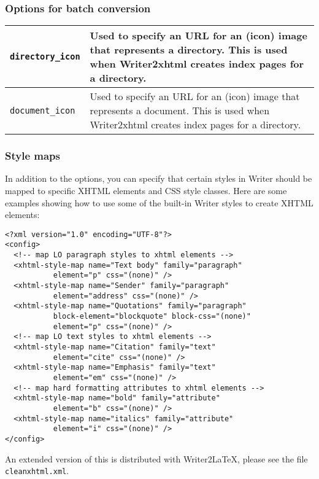 \documentclass{article}
\newcommand\textstyleSourceText[1]{\texttt{\textmd{#1}}}
\begin{document}
\subsubsection{Options for batch conversion}
\begin{center}
\begin{tabular}{|l|l|}

\hline
\mdseries \textstyleSourceText{directory\_icon} & \mdseries Used to specify an URL for an (icon) image that represents a directory. This is used when Writer2xhtml creates index pages for a directory.\\\hline
\mdseries \textstyleSourceText{document\_icon} & \mdseries Used to specify an URL for an (icon) image that represents a document. This is used when Writer2xhtml creates index pages for a directory.\\\hline
\end{tabular}
\end{center}
\subsubsection{Style maps}
{\mdseries
In addition to the options, you can specify that certain styles in Writer should be mapped to specific XHTML elements and CSS style classes. Here are some examples showing how to use some of the built-in Writer styles to create XHTML elements:}

\begin{verbatim}
<?xml version="1.0" encoding="UTF-8"?>
<config>
  <!-- map LO paragraph styles to xhtml elements -->
  <xhtml-style-map name="Text body" family="paragraph"   
           element="p" css="(none)" />  
  <xhtml-style-map name="Sender" family="paragraph"
           element="address" css="(none)" />
  <xhtml-style-map name="Quotations" family="paragraph"
           block-element="blockquote" block-css="(none)"
           element="p" css="(none)" />
  <!-- map LO text styles to xhtml elements -->
  <xhtml-style-map name="Citation" family="text"
           element="cite" css="(none)" />
  <xhtml-style-map name="Emphasis" family="text"
           element="em" css="(none)" />
  <!-- map hard formatting attributes to xhtml elements -->
  <xhtml-style-map name="bold" family="attribute"
           element="b" css="(none)" />
  <xhtml-style-map name="italics" family="attribute"
           element="i" css="(none)" />
</config>
\end{verbatim}
{\mdseries
An extended version of this is distributed with Writer2LaTeX, please see the file \textstyleSourceText{cleanxhtml.xml}.}
\end{document}
